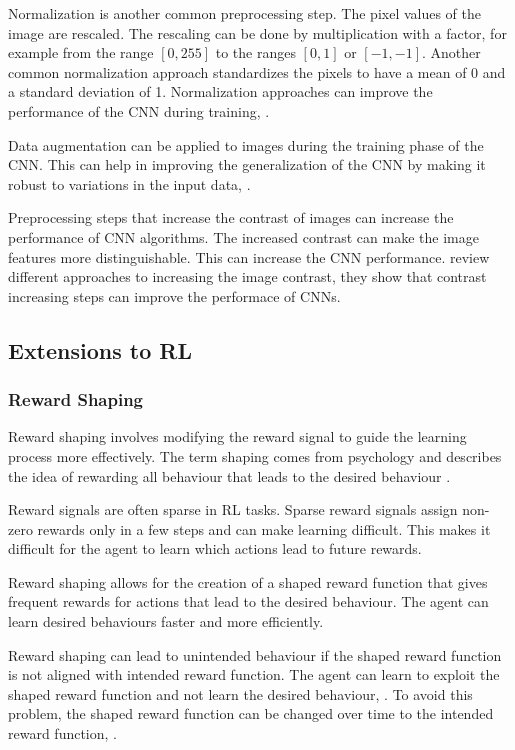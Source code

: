 Normalization is another common preprocessing step. The pixel values of the image are rescaled. The rescaling can be done by multiplication with a factor, for example from the range $[0,255]$ to the ranges $[0,1]$ or $[-1, -1]$. Another common normalization approach standardizes the pixels to have a mean of 0 and a standard deviation of 1. Normalization approaches can improve the performance of the \ac{CNN} during training, \autocite{cnn_norm}.

Data augmentation can be applied to images during the training phase of the \ac{CNN}. This can help in improving the generalization of the CNN by making it robust to variations in the input data, \autocite{cnn_data_augmentation}.

Preprocessing steps that increase the contrast of images can increase the performance of \ac{CNN} algorithms. The increased contrast can make the image features more distinguishable. This can increase the \ac{CNN} performance. \textcite{cnn_contrast} review different approaches to increasing the image contrast, they show that contrast increasing steps can improve the performace of \acp{CNN}.



\subsection{Extensions to \ac{RL}}

\subsubsection{Reward Shaping}
Reward shaping involves modifying the reward signal to guide the learning process more effectively. The term shaping comes from psychology and describes the idea of rewarding all behaviour that leads to the desired behaviour \autocite{rlbook2020}.

Reward signals are often sparse in \ac{RL} tasks. Sparse reward signals assign non-zero rewards only in a few steps and can make learning difficult. This makes it difficult for the agent to learn which actions lead to future rewards.

Reward shaping allows for the creation of a shaped reward function that gives frequent rewards for actions that lead to the desired behaviour. The agent can learn desired behaviours faster and more efficiently. 

Reward shaping can lead to unintended behaviour if the shaped reward function is not aligned with intended reward function. The agent can learn to exploit the shaped reward function and not learn the desired behaviour, \textcite{drl_for_ad}. 
To avoid this problem, the shaped reward function can be changed over time to the intended reward function, \textcite{rlbook2020}.


